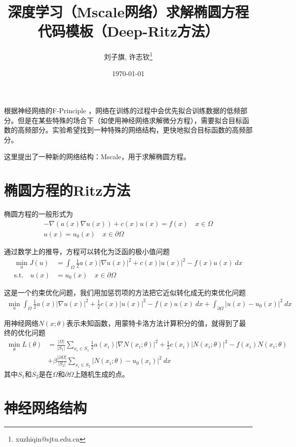\documentclass[12pt,a4paper]{article}
\title{深度学习（Mscale网络）求解椭圆方程代码模板（Deep-Ritz方法）}
\author{刘子旗,  许志钦\thanks{xuzhiqin@sjtu.edu.cn}}
\date{\today}
\begin{document}
\maketitle

根据神经网络的F-Principle \cite{fprinciple}，网络在训练的过程中会优先拟合训练数据的低频部分。但是在某些特殊的场合下（如使用神经网络求解微分方程），需要拟合目标函数的高频部分。实验希望找到一种特殊的网络结构，更快地拟合目标函数的高频部分。

这里提出了一种新的网络结构：Mscale，用于求解椭圆方程。

\section*{椭圆方程的Ritz方法}

椭圆方程的一般形式为
\begin{align*}
-\nabla(a(x) \nabla u(x)) + c(x) u(x) = f(x) \quad x \in \Omega \\
u(x) = u_0(x) \quad x \in \partial \Omega
\end{align*}

通过数学上的推导\cite{deep-ritz}，方程可以转化为泛函的极小值问题
\begin{align*}
\min_{u} J(u) & = \int_{\Omega} \frac{1}{2} a(x) |\nabla u(x)|^2 + c(x) |u(x)|^2 - f(x) u(x) \ dx \\
\text{s.t.} \quad u(x) & = u_0(x) \quad x \in \partial \Omega 
\end{align*}

这是一个约束优化问题，我们用加惩罚项的方法把它近似转化成无约束优化问题
\begin{align*}
\min_{u} \int_{\Omega} \frac{1}{2} a(x) |\nabla u(x)|^2 + \frac{1}{2} c(x) |u(x)|^2 - f(x) u(x) \ dx + \int_{\partial \Omega} |u(x) - u_0(x)|^2 \ dx
\end{align*}

用神经网络$N(x; \theta)$表示未知函数，用蒙特卡洛方法计算积分的值，就得到了最终的优化问题
\begin{align*}
\min_{\theta} L(\theta) & = \frac{|\Omega|}{|S_1|} \sum_{x_i \in S_1} \frac{1}{2} a(x_i) |\nabla N(x_i; \theta)|^2 + \frac{1}{2} c(x_i) |N(x_i; \theta)|^2 - f(x_i) N(x_i; \theta) \\
& + \beta \frac{|\partial \Omega|}{|S_2|} \sum_{x_i \in S_2} |N(x_i; \theta) - u_0(x_i)|^2 \ dx
\end{align*}
其中$S_1$和$S_2$是在$\Omega$和$\partial \Omega$上随机生成的点。

\section*{神经网络结构}
\end{document}
